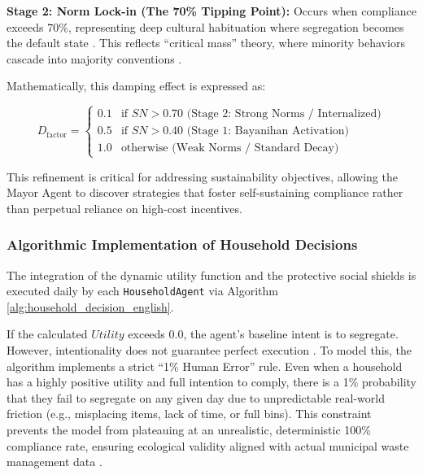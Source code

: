 \textbf{Stage 2: Norm Lock-in (The 70\% Tipping Point):} Occurs when compliance exceeds 70\%, representing deep cultural habituation where segregation becomes the default state \citep{Jimenez2025}. This reflects ``critical mass'' theory, where minority behaviors cascade into majority conventions \citep{Centola2018, Nyborg2024}. 

Mathematically, this damping effect is expressed as:

\begin{equation}
    D_{\mathrm{factor}} = 
    \begin{cases} 
        0.1 & \text{if } SN > 0.70 \text{ (Stage 2: Strong Norms / Internalized)} \\
        0.5 & \text{if } SN > 0.40 \text{ (Stage 1: Bayanihan Activation)} \\
        1.0 & \text{otherwise (Weak Norms / Standard Decay)}
    \end{cases}
\end{equation}

This refinement is critical for addressing sustainability objectives, allowing the Mayor Agent to discover strategies that foster self-sustaining compliance rather than perpetual reliance on high-cost incentives.

\subsubsection{Algorithmic Implementation of Household Decisions}

The integration of the dynamic utility function and the protective social shields is executed daily by each \texttt{HouseholdAgent} via Algorithm \ref{alg:household_decision_english}. 

If the calculated $Utility$ exceeds $0.0$, the agent's baseline intent is to segregate. However, intentionality does not guarantee perfect execution \citep{McCulloch2022}. To model this, the algorithm implements a strict ``1\% Human Error'' rule. Even when a household has a highly positive utility and full intention to comply, there is a 1\% probability that they fail to segregate on any given day due to unpredictable real-world friction (e.g., misplacing items, lack of time, or full bins). This constraint prevents the model from plateauing at an unrealistic, deterministic 100\% compliance rate, ensuring ecological validity aligned with actual municipal waste management data \citep{TianReview2024}.

